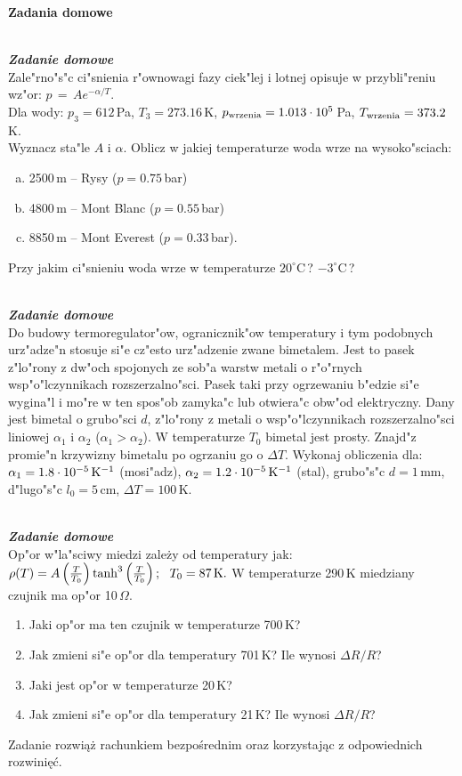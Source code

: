\documentclass[11pt,a4paper]{article}
\newcounter{zaddom}\newcommand{\zaddom}[1][]{\addtocounter{zaddom}{1} ~\\  {\bf \emph{Zadanie domowe \arabic{zaddom} #1 }} \\}
\begin{document}
\pagebreak
\begin{centering}
\bf{ Zadania domowe }\\[1mm]
\end{centering}
\vspace{1mm}

\zaddom
Zale"rno"s"c ci"snienia r"ownowagi fazy ciek"lej i lotnej opisuje 
w przybli"reniu wz"or: $ p \,=\, A e^{-\alpha/T} $.\\
Dla wody: $p_3 = 612\,$Pa, $T_3 = 273.16\,$K, 
$p_{\rm wrzenia} = 1.013\cdot 10^5\,$Pa, 
$T_{\rm wrzenia} = 373.2\,$K.\\ 
Wyznacz sta"le $A$ i $\alpha$.
Oblicz w jakiej temperaturze woda wrze na wysoko"sciach:
\begin{enumerate}[a)] 
\item 2500\,m -- Rysy ($p = 0.75\,$bar)
\item 4800\,m -- Mont Blanc ($p = 0.55\,$bar)
\item 8850\,m -- Mont Everest ($p = 0.33\,$bar).
\end{enumerate}
Przy jakim ci"snieniu woda wrze w temperaturze $20^\circ$C\,? $-3^\circ$C\,?

\zaddom
Do budowy termoregulator"ow, ogranicznik"ow temperatury i tym
podobnych urz"adze"n stosuje si"e cz"esto urz"adzenie zwane bimetalem.
Jest to pasek z"lo"rony z dw"och spojonych ze sob"a warstw metali
o r"o"rnych wsp"o"lczynnikach rozszerzalno"sci.
Pasek taki przy ogrzewaniu b"edzie si"e wygina"l i mo"re
w ten spos"ob zamyka"c lub otwiera"c obw"od elektryczny.
Dany jest bimetal o grubo"sci $d$, z"lo"rony z metali
o wsp"o"lczynnikach rozszerzalno"sci liniowej $\alpha_1$ i $\alpha_2$
($\alpha_1 > \alpha_2$).
W temperaturze $T_0$ bimetal jest prosty.
Znajd"z promie"n krzywizny bimetalu po ogrzaniu go o $\Delta T$.
Wykonaj obliczenia dla: $\alpha_1=1.8\cdot 10^{-5}\,{\rm K}^{-1}$ (mosi"adz),
$\alpha_2=1.2\cdot 10^{-5}\,{\rm K}^{-1}$ (stal), grubo"s"c $d=1\,$mm,
d"lugo"s"c $l_0=5\,$cm, $\Delta T=100\,$K.

\zaddom
Op"or w"la"sciwy miedzi zależy od temperatury jak:
$ \rho(T) = 
  A \left(\frac{T}{T_0}\right) \tanh^3 \left(\frac{T}{T_0}\right);
  ~~ T_0 = 87\,\rm{K}. 
$
W temperaturze 290\,K miedziany czujnik ma op"or 10\,$\Omega$. 
\begin{enumerate}
\item Jaki op"or ma ten czujnik w temperaturze 700\,K? 
\item Jak zmieni si"e op"or dla temperatury 701\,K? Ile wynosi $\Delta R/R$? 
\item Jaki jest op"or w temperaturze 20\,K?
\item Jak zmieni si"e op"or dla temperatury 21\,K? Ile wynosi  $\Delta R/R$?
\end{enumerate}
Zadanie rozwiąż rachunkiem bezpośrednim oraz korzystając z odpowiednich rozwinięć.
\end{document}
